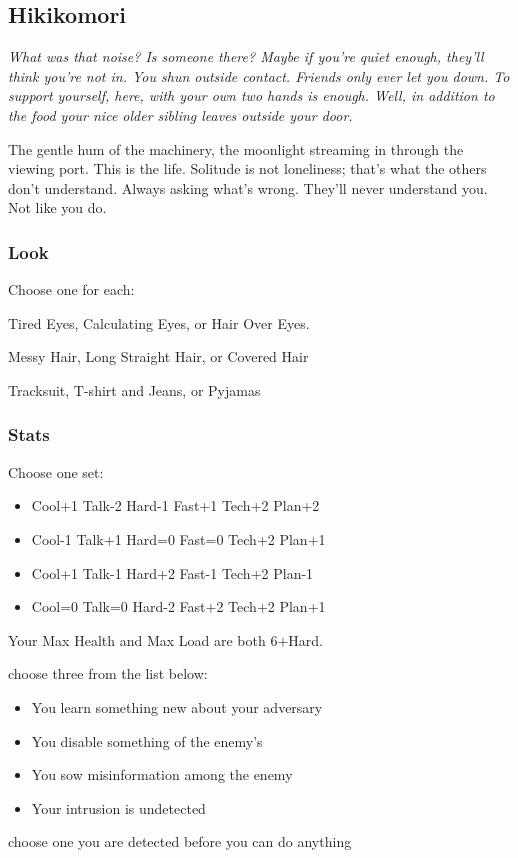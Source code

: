 \subsection{Hikikomori}
{\itshape What was that noise? Is someone there? Maybe if you're quiet enough, they'll think you're not in. You shun outside contact. Friends only ever let you down. To support yourself, here, with your own two hands is enough. Well, in addition to the food your nice older sibling leaves outside your door.

The gentle hum of the machinery, the moonlight streaming in through the viewing port. This is the life. Solitude is not loneliness; that's what the others don't understand. Always asking what's wrong. They'll never understand you. Not like you do.}

\subsubsection{Look}
Choose one for each:

Tired Eyes, Calculating Eyes, or Hair Over Eyes.

Messy Hair, Long Straight Hair, or Covered Hair

Tracksuit, T-shirt and Jeans, or Pyjamas

\subsubsection{Stats}
Choose one set:
\begin{itemize}
\setlength\itemsep{0em}
\item Cool+1 Talk-2 Hard-1 Fast+1 Tech+2 Plan+2
\item Cool-1 Talk+1 Hard=0 Fast=0 Tech+2 Plan+1
\item Cool+1 Talk-1 Hard+2 Fast-1 Tech+2 Plan-1
\item Cool=0 Talk=0 Hard-2 Fast+2 Tech+2 Plan+1
\end{itemize}

Your Max Health and Max Load are both 6+Hard.

{choose three from the list below:
\begin{itemize}
\item You learn something new about your adversary
\item You disable something of the enemy's
\item You sow misinformation among the enemy
\item Your intrusion is undetected
\end{itemize}}
{choose one}
{you are detected before you can do anything}

